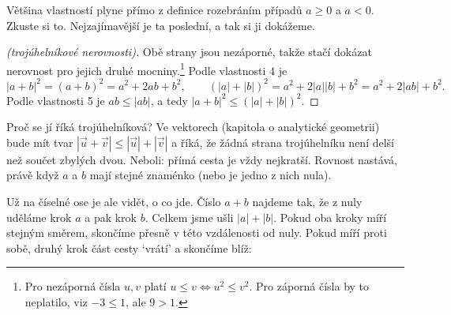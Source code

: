 Většina vlastností plyne přímo z definice rozebráním případů $a\geq 0$ a $a < 0$. Zkuste si to. Nejzajímavější je ta poslední, a tak si ji dokážeme.

\begin{proof}[(trojúhelníkové nerovnosti)]
  Obě strany jsou nezáporné, takže stačí dokázat nerovnost pro jejich druhé mocniny.\footnote{Pro nezáporná čísla $u, v$ platí $u\leq v\Leftrightarrow u^2\leq v^2$. Pro záporná čísla by to neplatilo, viz $-3\leq 1$, ale $9 > 1$.} Podle vlastnosti 4 je
  \begin{equation*}
    |a + b|^2 = {(a + b)}^2 = a^2 + 2ab + b^2,\qquad {(|a| + |b|)}^2 = a^2 + 2|a||b| + b^2 = a^2 + 2|ab| + b^2.
  \end{equation*}
  Podle vlastnosti 5 je $ab\leq|ab|$, a tedy $|a + b|^2\leq{(|a| + |b|)}^2$.
\end{proof}

Proč se jí říká trojúhelníková? Ve vektorech (kapitola o analytické geometrii) bude mít tvar $|\vec{u} + \vec{v}|\leq|\vec{u}| + |\vec{v}|$ a říká, že žádná strana trojúhelníku není delší než součet zbylých dvou. Neboli: přímá cesta je vždy nejkratší. Rovnost nastává, právě když $a$ a $b$ mají stejné znaménko (nebo je jedno z nich nula).

Už na číselné ose je ale vidět, o co jde. Číslo $a + b$ najdeme tak, že z nuly uděláme krok $a$ a pak krok $b$. Celkem jsme ušli $|a| + |b|$. Pokud oba kroky míří stejným směrem, skončíme přesně v této vzdálenosti od nuly. Pokud míří proti sobě, druhý krok část cesty `vrátí' a skončíme blíž:
\begin{center}
\end{center}


